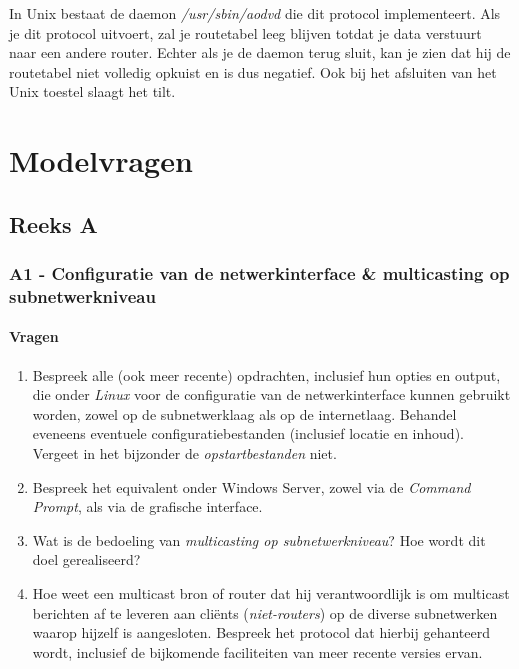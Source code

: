 \documentclass{report}
\begin{document}
In Unix bestaat de daemon \textit{/usr/sbin/aodvd} die dit protocol implementeert. Als je dit protocol uitvoert, zal je routetabel leeg blijven totdat je data verstuurt naar een andere router. Echter als je de daemon terug sluit, kan je zien dat hij de routetabel niet volledig opkuist en is dus negatief. Ook bij het afsluiten van het Unix toestel slaagt het tilt.

\part{Modelvragen}
\chapter{Reeks A}

\section{A1 - Configuratie van de netwerkinterface \& multicasting op subnetwerkniveau}
\subsection{Vragen}
\begin{enumerate}
	\item Bespreek alle (ook meer recente) opdrachten, inclusief hun opties en output, die onder \textit{Linux} voor de configuratie van de netwerkinterface kunnen gebruikt worden, zowel op de subnetwerklaag als op de internetlaag. Behandel eveneens eventuele configuratiebestanden (inclusief locatie en inhoud). Vergeet in het bijzonder de \textit{opstartbestanden} niet.
	\item Bespreek het equivalent onder Windows Server, zowel via de \textit{Command Prompt}, als via de grafische interface.
	\item Wat is de bedoeling van \textit{multicasting op subnetwerkniveau}? Hoe wordt dit doel gerealiseerd?
	\item Hoe weet een multicast bron of router dat hij verantwoordlijk is om multicast berichten af te leveren aan cliënts (\textit{niet-routers}) op de diverse subnetwerken waarop hijzelf is aangesloten. Bespreek het protocol dat hierbij gehanteerd wordt, inclusief de bijkomende faciliteiten van meer recente versies ervan.
\end{enumerate}
\end{document}
